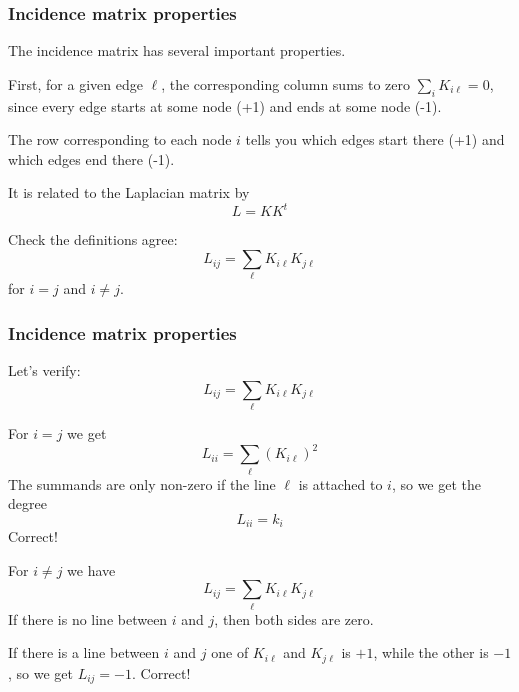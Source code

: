\documentclass[10pt,aspectratio=169,dvipsnames]{beamer}
\begin{document}
\begin{frame}
  \frametitle{Incidence matrix properties}

  The incidence matrix has several important properties.

  First, for a given edge $\ell$, the corresponding column sums to zero $\sum_{i} K_{i\ell} = 0$, since every edge starts at some node (+1) and ends at some node (-1).

  The row corresponding to each node $i$ tells you which edges start there (+1) and which edges end there (-1).

  It is related to the Laplacian matrix by
  \begin{equation*}
    L = KK^t
  \end{equation*}

  Check the definitions agree:
  \begin{equation*}
    L_{ij} = \sum_\ell K_{i\ell}K_{j\ell}
  \end{equation*}
  for $i=j$ and $i\neq j$.

\end{frame}



\begin{frame}
  \frametitle{Incidence matrix properties}

  Let's verify:
  \begin{equation*}
    L_{ij} = \sum_\ell K_{i\ell}K_{j\ell}
  \end{equation*}

  For $i=j$ we get
  \begin{equation*}
    L_{ii} = \sum_\ell \left(K_{i\ell}\right)^2
  \end{equation*}
  The summands are only non-zero if the line $\ell$ is attached to $i$, so we get the degree
  \begin{equation*}
    L_{ii} = k_i
  \end{equation*}
  Correct!

  For $i\neq j$ we have
  \begin{equation*}
    L_{ij} = \sum_\ell K_{i\ell}K_{j\ell}
  \end{equation*}
  If there is no line between $i$ and $j$, then both sides are zero.

  If there is a line between $i$ and $j$ one of $K_{i\ell}$ and $K_{j\ell}$ is $+1$, while the other is $-1$, so we get $L_{ij} = -1$. Correct!


\end{frame}
\end{document}

